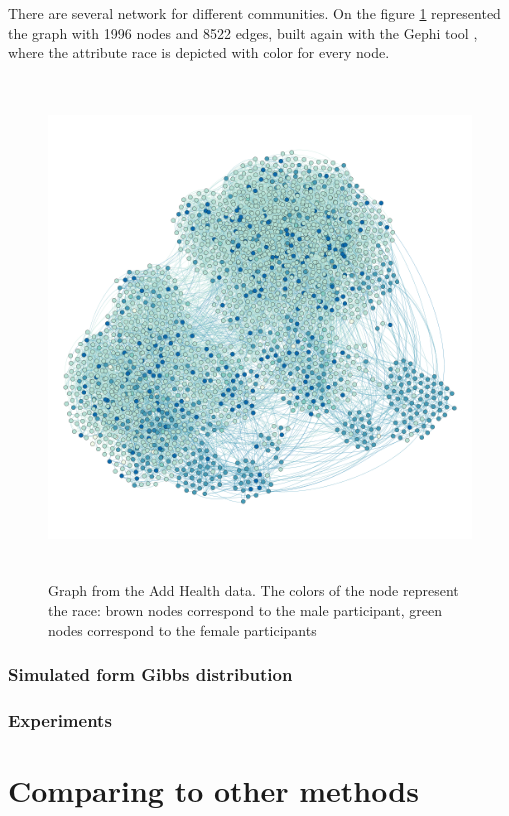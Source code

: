 \documentclass[12pt]{report}
\begin{document}
There are several network for different communities. 
On the figure \ref{fig:addhealthRace} represented the graph with 1996 nodes and 8522 edges, built again with the Gephi tool \cite{GEPHI}, where the attribute race is depicted with color for every node.
\begin{figure}[ht]
    \centering
    \includegraphics[height=500px]{addhealthRace}
    \caption{Graph from the Add Health data. The colors of the node represent the race: brown nodes correspond to the male participant, green nodes correspond to the female participants}
    \label{fig:addhealthRace}
\end{figure}


\subsection{Simulated form Gibbs distribution}

\subsection{Experiments}

\chapter{Comparing to other methods}
\end{document}
